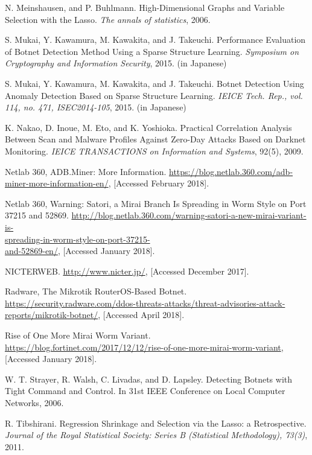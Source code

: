 \documentclass[letterpaper]{sig-alternate-10pt}
\begin{document}
\begin{thebibliography}{100}
N. Meinshausen, and P. Buhlmann. High-Dimensional Graphs and Variable Selection with the Lasso. {\it The annals of statistics}, 2006.

S. Mukai, Y. Kawamura, M. Kawakita, and J. Takeuchi. Performance Evaluation of Botnet Detection Method Using a Sparse Structure Learning. {\it Symposium on Cryptography and Information Security}, 2015. (in Japanese)

S. Mukai, Y. Kawamura, M. Kawakita, and J. Takeuchi. Botnet Detection Using Anomaly Detection Based on Sparse Structure Learning. {\it IEICE Tech. Rep., vol. 114, no. 471, ISEC2014-105}, 2015. (in Japanese)

K. Nakao, D. Inoue, M. Eto, and K. Yoshioka. Practical Correlation Analysis Between Scan and Malware Profiles Against Zero-Day Attacks Based on Darknet Monitoring. {\it IEICE TRANSACTIONS on Information and Systems}, 92(5), 2009.

Netlab 360, ADB.Miner: More Information. \url{https://blog.netlab.360.com/adb-miner-more-information-en/}, [Accessed February 2018].

Netlab 360, Warning: Satori, a Mirai Branch Is Spreading in Worm Style on Port 37215 and 52869. \url{http://blog.netlab.360.com/warning-satori-a-new-mirai-variant-is-}\\\url{spreading-in-worm-style-on-port-37215-}\\\url{and-52869-en/}, [Accessed January 2018].

NICTERWEB. \url{http://www.nicter.jp/}, [Accessed December 2017].

Radware, The Mikrotik RouterOS-Based Botnet. \url{https://security.radware.com/ddos-threats-attacks/threat-advisories-attack-reports/mikrotik-botnet/}, [Accessed April 2018].

Rise of One More Mirai Worm Variant. \url{https://blog.fortinet.com/2017/12/12/rise-of-one-more-mirai-worm-variant}, [Accessed January 2018].

W. T. Strayer, R. Walsh, C. Livadas, and D. Lapsley. Detecting Botnets with Tight Command and Control. In {31st IEEE Conference on Local Computer Networks}, 2006.

R. Tibshirani. Regression Shrinkage and Selection via the Lasso: a Retrospective. {\it Journal of the Royal Statistical Society: Series B (Statistical Methodology), 73(3)}, 2011.


\end{thebibliography}
\end{document}
